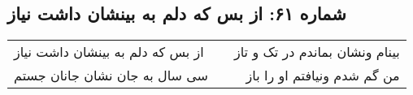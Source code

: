 \begin{center}
\section*{شماره ۶۱: از بس که دلم به بینشان داشت نیاز}
\label{sec:061}
\begin{longtable}{l p{0.5cm} r}
از بس که دلم به بینشان داشت نیاز
&&
بینام ونشان بماندم در تک و تاز
\\
سی سال به جان نشان جانان جستم
&&
من گم شدم ونیافتم او را باز
\\
\end{longtable}
\end{center}
